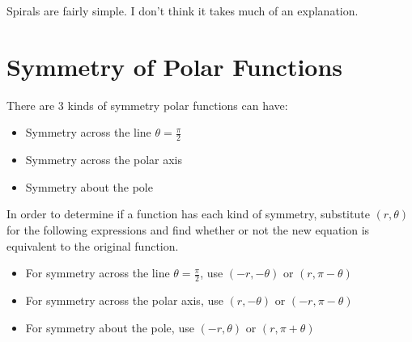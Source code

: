 \documentclass{report}
\begin{document}

    Spirals are fairly simple. I don't think it takes much of an explanation.

    \section{Symmetry of Polar Functions}

    There are 3 kinds of symmetry polar functions can have:
    \begin{itemize}
        \item Symmetry across the line $\theta=\frac{\pi}{2}$
        \item Symmetry across the polar axis
        \item Symmetry about the pole
    \end{itemize}

    In order to determine if a function has each kind of symmetry, substitute $(r,\theta)$ for the following expressions and find whether or not the new equation is equivalent to the original function.
    \begin{itemize}
        \item For symmetry across the line $\theta=\frac{\pi}{2}$, use $(-r,-\theta)$ or $(r, \pi-\theta)$
        \item For symmetry across the polar axis, use $(r,-\theta)$ or $(-r,\pi-\theta)$
        \item For symmetry about the pole, use $(-r,\theta)$ or $(r,\pi+\theta)$
    \end{itemize}
\end{document}
